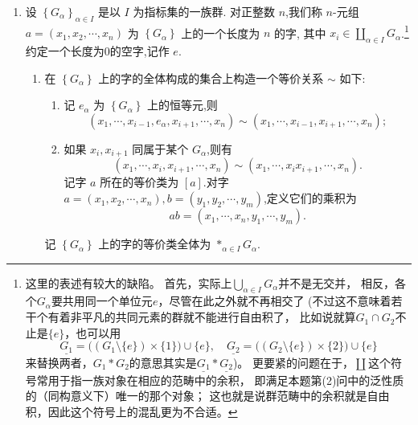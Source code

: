 \begin{enumerate}
\begin{enumerate}[label=(\arabic*)]
\item 记 $N = \operatorname{Ker}p_1$,证明 $N$ 可视作 $G_2$ 的一个正规子群;
\item 记 $H = G_{2}/N$, $f_2 : G_2 \rightarrow H$ 是自然投射.试构造一个自然的满同态 $f_1 : G_1 \rightarrow H$,使得 $f_1 \circ p_1 = f_2 \circ p_2$;
\item 定义
\[G_1 \times_{H}G_2 \triangleq \{(g_1 , g_2) \in G_1 \times G_2 \mid f_{1}(g_1) = f_{2}(g_2)\},\]
称其为$G_1$与$G_2$在$H$上的纤维积(fiber product).证明: $K = G_1 \times_{H}G_2$.
\end{enumerate}
\item 设 $\left\{G_{\alpha}\right\}_{\alpha \in I}$ 是以 $I$ 为指标集的一族群.
对正整数 $n$,我们称 $n$-元组 $a = (x_1 , x_2 , \cdots , x_n)$ 为 $\left\{G_{\alpha}\right\}$ 上的一个长度为 $n$ 的字,
其中 $x_i \in \coprod\limits_{\alpha \in I}G_{\alpha}$.\footnote{这里的表述有较大的缺陷。
首先，实际上$\bigcup\limits_{\alpha \in I}G_\alpha$并不是无交并，
相反，各个$G_\alpha$要共用同一个单位元$e$，尽管在此之外就不再相交了
(不过这不意味着若干个有着非平凡的共同元素的群就不能进行自由积了，
比如说就算$G_1 \cap G_2$不止是$\{e\}$，也可以用
\[\underline{G_1}=\big((G_1\setminus\{e\})\times\{1\}\big)\cup\{e\},\quad
\underline{G_2}=\big((G_2\setminus\{e\})\times\{2\}\big)\cup\{e\}\]
来替换两者，$G_1*G_2$的意思其实是$\underline{G_1}*\underline{G_2}$)。
更要紧的问题在于，$\coprod$这个符号常用于指一族对象在相应的范畴中的余积，
即满足本题第(2)问中的泛性质的（同构意义下）唯一的那个对象；
这也就是说群范畴中的余积就是自由积，因此这个符号上的混乱更为不合适。}
约定一个长度为$0$的空字,记作 $e$.
\printfootnotes
\begin{enumerate}[label=(\arabic*)]
\item 在 $\left\{G_{\alpha}\right\}$ 上的字的全体构成的集合上构造一个等价关系 $\sim$ 如下:
\begin{enumerate}[label=(\alph*)]
\item 记 $e_{\alpha}$ 为 $\left\{G_{\alpha}\right\}$ 上的恒等元,则
\[(x_1 , \cdots , x_{i-1}, e_{\alpha}, x_{i+1}, \cdots, x_n) \sim (x_1 , \cdots , x_{i-1}, x_{i+1}, \cdots, x_n);\]
\item 如果 $x_{i}, x_{i+1}$ 同属于某个 $G_{\alpha}$,则有
\[(x_1 , \cdots , x_{i}, x_{i+1}, \cdots, x_n) \sim (x_1 , \cdots , x_{i}x_{i+1}, \cdots, x_n).\]
记字 $a$ 所在的等价类为 $\left[a\right]$.对字 $a = (x_1 , x_2 , \cdots , x_n), b = (y_1 , y_2 , \cdots , y_m)$,定义它们的乘积为
\[ab = (x_1 , \cdots , x_n , y_1 , \cdots , y_m).\] 
\end{enumerate}
记 $\left\{G_{\alpha}\right\}$ 上的字的等价类全体为 $* _{\alpha \in I} G_{\alpha}$.

\end{enumerate}
\end{enumerate}
